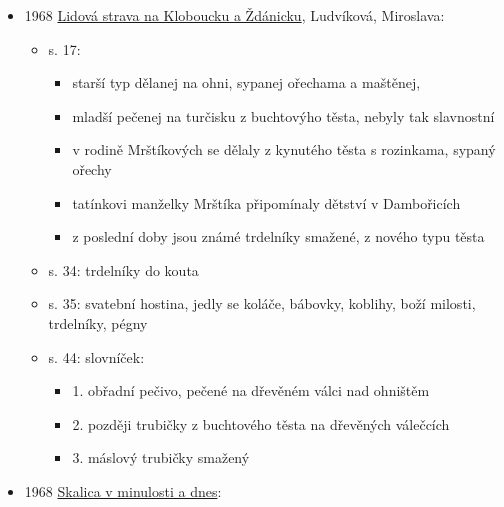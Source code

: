 \begin{itemize}
  \begin{itemize}
  \tightlist
  \item
    s. 188:

    \begin{itemize}
    \tightlist
    \item
      v 18. století se ustálila česká lidová kuchyně, mizely pokrmy
      připravovaný na otevřeném ohništi. Ty se zachovaly déle na
      východní Moravě
    \item
      šířilo se používání pekáčů a forem na pečivo a kaše
    \item
      obrázek otevřeného ohniště z Horňácka s železným nádobím
    \end{itemize}
  \item
    s. 530: odstavec o koláčích na Slovensku, trdelník je na západním
    Slovensku, pochazí z Moravy
  \end{itemize}
\item
  1968
  \href{https://ceskadigitalniknihovna.cz/uuid/uuid:9e8373c6-0e68-11e4-a3ad-0050569d679d}{Lidová
  strava na Kloboucku a Ždánicku}, Ludvíková, Miroslava:

  \begin{itemize}
  \tightlist
  \item
    s. 17:

    \begin{itemize}
    \tightlist
    \item
      starší typ dělanej na ohni, sypanej ořechama a maštěnej,
    \item
      mladší pečenej na turčisku z buchtovýho těsta, nebyly tak
      slavnostní
    \item
      v rodině Mrštíkových se dělaly z kynutého těsta s rozinkama,
      sypaný ořechy
    \item
      tatínkovi manželky Mrštíka připomínaly dětství v Dambořicích
    \item
      z poslední doby jsou známé trdelníky smažené, z nového typu těsta
    \end{itemize}
  \item
    s. 34: trdelníky do kouta
  \item
    s. 35: svatební hostina, jedly se koláče, bábovky, koblihy, boží
    milosti, trdelníky, pégny
  \item
    s. 44: slovníček:

    \begin{itemize}
    \tightlist
    \item
      1. obřadní pečivo, pečené na dřevěném válci nad ohništěm
    \item
      2. později trubičky z buchtového těsta na dřevěných válečcích
    \item
      3. máslový trubičky smažený
    \end{itemize}
  \end{itemize}
\item
  1968
  \href{https://www.google.cz/books/edition/Skalica_v_minulosti_a_dnes/VF8tAQAAIAAJ?hl=en&gbpv=1&bsq=trdeln\%C3\%ADk&dq=trdeln\%C3\%ADk&printsec=frontcover}{Skalica
  v minulosti a dnes}:


\end{itemize}
